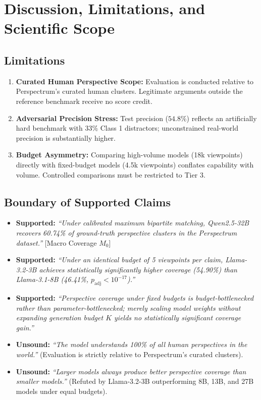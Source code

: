 \documentclass[11pt,a4paper]{article}
\begin{document}
\section{Discussion, Limitations, and Scientific Scope}
\label{sec:discussion}

\subsection{Limitations}
\begin{enumerate}[leftmargin=*,itemsep=1pt]
    \item \textbf{Curated Human Perspective Scope:} Evaluation is conducted relative to Perspectrum's curated human clusters. Legitimate arguments outside the reference benchmark receive no score credit.
    \item \textbf{Adversarial Precision Stress:} Test precision ($54.8\%$) reflects an artificially hard benchmark with 33\% Class 1 distractors; unconstrained real-world precision is substantially higher.
    \item \textbf{Budget Asymmetry:} Comparing high-volume models (18k viewpoints) directly with fixed-budget models (4.5k viewpoints) conflates capability with volume. Controlled comparisons must be restricted to Tier 3.
\end{enumerate}

\subsection{Boundary of Supported Claims}
\begin{itemize}[leftmargin=*,itemsep=1pt]
    \item \textbf{Supported:} \textit{``Under calibrated maximum bipartite matching, Qwen2.5-32B recovers 60.74\% of ground-truth perspective clusters in the Perspectrum dataset.''} [Macro Coverage $M_0$]
    \item \textbf{Supported:} \textit{``Under an identical budget of 5 viewpoints per claim, Llama-3.2-3B achieves statistically significantly higher coverage (54.90\%) than Llama-3.1-8B (46.41\%, $p_{\text{adj}} < 10^{-17}$).''}
    \item \textbf{Supported:} \textit{``Perspective coverage under fixed budgets is budget-bottlenecked rather than parameter-bottlenecked; merely scaling model weights without expanding generation budget $K$ yields no statistically significant coverage gain.''}
    \item \textbf{Unsound:} \textit{``The model understands 100\% of all human perspectives in the world.''} (Evaluation is strictly relative to Perspectrum's curated clusters).
    \item \textbf{Unsound:} \textit{``Larger models always produce better perspective coverage than smaller models.''} (Refuted by Llama-3.2-3B outperforming 8B, 13B, and 27B models under equal budgets).
\end{itemize}
\end{document}
